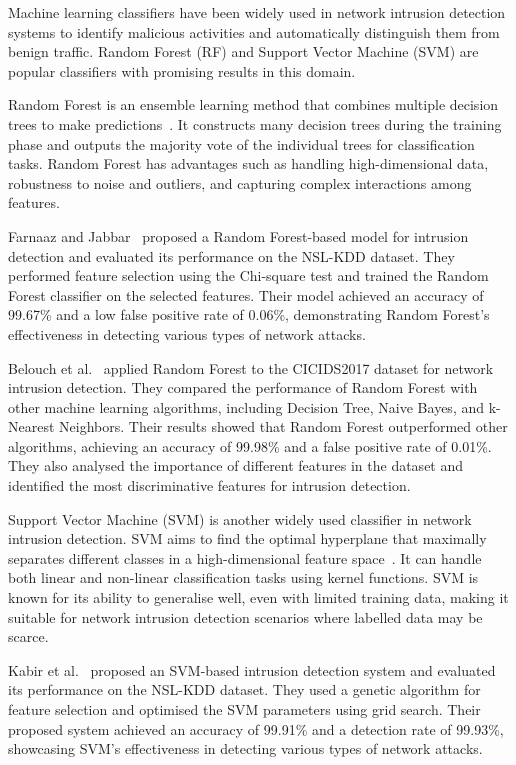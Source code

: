 Machine learning classifiers have been widely used in network intrusion detection systems to identify malicious activities and automatically distinguish them from benign traffic. Random Forest (RF) and Support Vector Machine (SVM) are popular classifiers with promising results in this domain.

Random Forest is an ensemble learning method that combines multiple decision trees to make predictions~\cite{hastie2009random}. It constructs many decision trees during the training phase and outputs the majority vote of the individual trees for classification tasks. Random Forest has advantages such as handling high-dimensional data, robustness to noise and outliers, and capturing complex interactions among features.

Farnaaz and Jabbar~\cite{farnaaz2016random} proposed a Random Forest-based model for intrusion detection and evaluated its performance on the NSL-KDD dataset. They performed feature selection using the Chi-square test and trained the Random Forest classifier on the selected features. Their model achieved an accuracy of 99.67\% and a low false positive rate of 0.06\%, demonstrating Random Forest's effectiveness in detecting various types of network attacks.

Belouch et al.~\cite{belouch2018performance} applied Random Forest to the CICIDS2017 dataset for network intrusion detection. They compared the performance of Random Forest with other machine learning algorithms, including Decision Tree, Naive Bayes, and k-Nearest Neighbors. Their results showed that Random Forest outperformed other algorithms, achieving an accuracy of 99.98\% and a false positive rate of 0.01\%. They also analysed the importance of different features in the dataset and identified the most discriminative features for intrusion detection.

Support Vector Machine (SVM) is another widely used classifier in network intrusion detection. SVM aims to find the optimal hyperplane that maximally separates different classes in a high-dimensional feature space~\cite{cortes1995support}. It can handle both linear and non-linear classification tasks using kernel functions. SVM is known for its ability to generalise well, even with limited training data, making it suitable for network intrusion detection scenarios where labelled data may be scarce.

Kabir et al.~\cite{kabir2017network} proposed an SVM-based intrusion detection system and evaluated its performance on the NSL-KDD dataset. They used a genetic algorithm for feature selection and optimised the SVM parameters using grid search. Their proposed system achieved an accuracy of 99.91\% and a detection rate of 99.93\%, showcasing SVM's effectiveness in detecting various types of network attacks.

